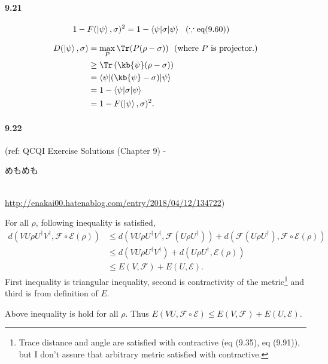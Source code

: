 \paragraph{9.21}
\begin{align*}
    1 - F(\ket{\psi} ,\sigma)^2 &= 1 - \braket{\psi | \sigma | \psi} ~~(\because \text{eq} (9.60))
\end{align*}


\begin{align*}
    D(\ket{\psi}, \sigma) &= \max_P \Tr (P (\rho - \sigma)) ~~(\text{where } P \text{ is projector.})\\
        &\geq \Tr \left(\kb{\psi} (\rho - \sigma)\right)\\
        &= \braket{\psi | (\kb{\psi} - \sigma) | \psi}\\
        &= 1 - \braket{\psi | \sigma | \psi}\\
        &= 1 - F(\ket{\psi}, \sigma)^2.
\end{align*}

\paragraph{9.22}
(ref: QCQI Exercise Solutions (Chapter 9) - \begin{CJK}{UTF8}{ipxm}めもめも\end{CJK} \\ \url{http://enakai00.hatenablog.com/entry/2018/04/12/134722})

For all $\rho$, following inequality is satisfied,
\begin{align*}
        d(VU \rho U^\dagger V^\dagger, \mathcal{F} \circ \mathcal{E}(\rho))
        &\leq d(VU \rho U^\dagger V^\dagger, \mathcal{F}(U\rho U^\dagger)) + d(\mathcal{F}(U\rho U^\dagger), \mathcal{F}\circ \mathcal{E}(\rho)) \\
        &\leq d(VU \rho U^\dagger V^\dagger) + d(U\rho U^\dagger, \mathcal{E}(\rho))\\
        &\leq E(V, \mathcal{F})+ E(U, \mathcal{E}).
\end{align*}
First inequality is triangular inequality, second is contractivity of the metric\footnote{Trace distance and angle are satisfied with contractive (eq (9.35), eq (9.91)), but I don't assure that arbitrary metric satisfied with contractive. }
and third is from definition of $E$.

Above inequality is hold for all $\rho$. Thus $E(VU, \mathcal{F} \circ \mathcal{E}) \leq E(V, \mathcal{F})+ E(U, \mathcal{E})$.


